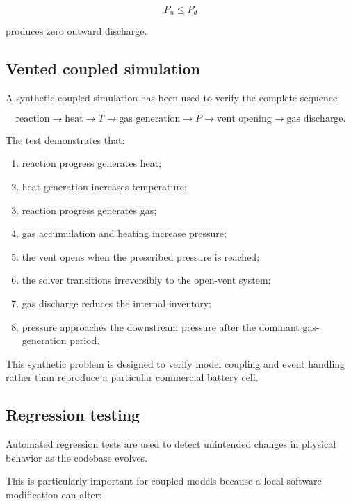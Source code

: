 \begin{equation}
    P_u
    \leq
    P_d
\end{equation}

produces zero outward discharge.


\subsection{Vented coupled simulation}

A synthetic coupled simulation has been used to verify the complete
sequence

\begin{equation}
    \text{reaction}
    \rightarrow
    \text{heat}
    \rightarrow
    T
    \rightarrow
    \text{gas generation}
    \rightarrow
    P
    \rightarrow
    \text{vent opening}
    \rightarrow
    \text{gas discharge}.
\end{equation}

The test demonstrates that:

\begin{enumerate}
    \item reaction progress generates heat;
    \item heat generation increases temperature;
    \item reaction progress generates gas;
    \item gas accumulation and heating increase pressure;
    \item the vent opens when the prescribed pressure is reached;
    \item the solver transitions irreversibly to the open-vent system;
    \item gas discharge reduces the internal inventory;
    \item pressure approaches the downstream pressure after the dominant
          gas-generation period.
\end{enumerate}

This synthetic problem is designed to verify model coupling and event
handling rather than reproduce a particular commercial battery cell.


\subsection{Regression testing}

Automated regression tests are used to detect unintended changes in
physical behavior as the codebase evolves.

This is particularly important for coupled models because a local
software modification can alter:

